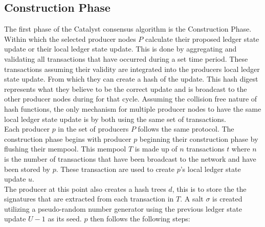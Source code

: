 \documentclass{article}
\begin{document}
\subsection{Construction Phase}

The first phase of the Catalyst consensus algorithm is the Construction Phase. Within which the selected producer nodes  $P$ calculate their proposed ledger state update or their local ledger state update. This is done by aggregating and validating all transactions that have occurred during a set time period. These transactions assuming their validity are integrated into the producers local ledger state update. From which they can create a hash of the update. This hash digest represents what they believe to be the correct update and is broadcast to the other producer nodes during for that cycle. Assuming the collision free nature of hash functions, the only mechanism for multiple producer nodes to have the same local ledger state update is by both using the same set of transactions. \\



Each producer $p$ in the set of producers $P$ follows the same protocol. The construction phase begins with producer $p$ beginning their construction phase by flushing their mempool. This mempool $T$ is made up of $n$ transactions $t$  where $n$ is the number of transactions that have been broadcast to the network and have been stored by $p$. These transaction are used to create $p$'s local ledger state update $u$.  \\

The producer at this point also creates a hash trees $d$, this is to store the the signatures that are extracted from each transaction in $T$. A salt $\sigma$ is created utilizing a pseudo-random number generator using the previous ledger state update $U-1$ as its seed. $p$ then follows the following steps:
\end{document}
